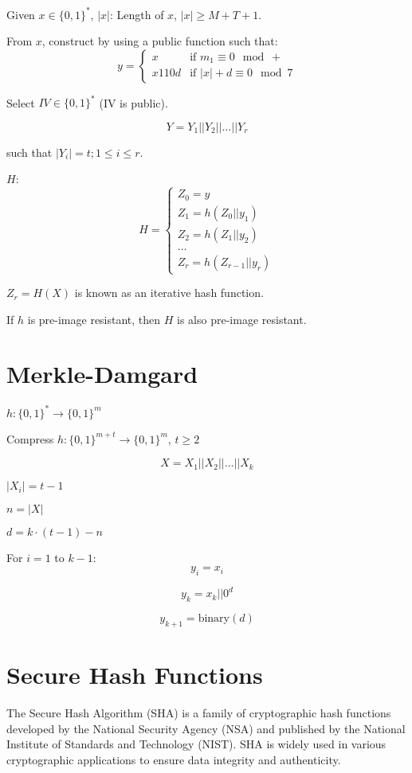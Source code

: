 \documentclass[11pt]{article}
\begin{document}
Given $x \in \{0, 1\}^*$, $|x|$: Length of $x$, $|x| \geq M + T + 1$.

From $x$, construct by using a public function such that:
\[y = \begin{cases} x & \text{if } m_1 \equiv 0 \mod + \\
x110d & \text{if } |x| + d \equiv 0 \mod 7 \end{cases}\]

Select $IV \in \{0, 1\}^*$ (IV is public).

\[Y = Y_1 || Y_2 || \ldots || Y_r\]

such that $|Y_i| = t; 1 \leq i \leq r$.

$H$:
\[
H = \begin{cases} Z_0 = y \\
Z_1 = h(Z_0 || y_1) \\
Z_2 = h(Z_1 || y_2) \\
\ldots \\
Z_r = h(Z_{r-1} || y_r) \end{cases}
\]

$Z_r = H(X)$ is known as an iterative hash function.

If $h$ is pre-image resistant, then $H$ is also pre-image resistant.

\section{Merkle-Damgard}

$h: \{0,1\}^* \rightarrow \{0, 1\}^m$

Compress $h: \{0,1\}^{m+t} \rightarrow \{0, 1\}^m$, $t \geq 2$

\[X = X_1 || X_2 || \ldots || X_k\]

$|X_i| = t - 1$

$n = |X|$

$d = k \cdot (t - 1) - n$

For $i = 1$ to $k-1$:
\[y_i = x_i\]

\[y_k = x_k || 0^d\]

\[y_{k+1} = \text{binary}(d)\]



\section{Secure Hash Functions}

The Secure Hash Algorithm (SHA) is a family of cryptographic hash functions developed by the National Security Agency (NSA) and published by the National Institute of Standards and Technology (NIST). SHA is widely used in various cryptographic applications to ensure data integrity and authenticity.
\end{document}

